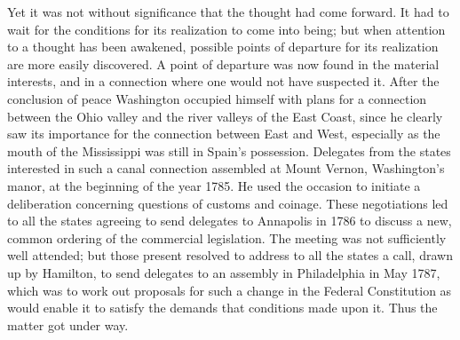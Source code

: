 \documentclass[12pt,a4paper,openany]{book}
\begin{document}
Yet it was not without significance that the thought had come
forward. It had to wait for the conditions for its
realization to come into being; but when attention to a thought
has been awakened, possible points of departure for its
realization are more easily discovered. A point of departure was now found in the material
interests, and in a connection where one would not have
suspected it. After the conclusion of peace Washington occupied
himself with plans for a connection between the Ohio valley and
the river valleys of the East Coast, since he clearly saw its importance for
the connection between East and West, especially as the mouth of the Mississippi
was still in Spain's possession. Delegates from the states
interested in such a canal connection assembled at
Mount Vernon, Washington's manor, at the beginning of the
year 1785. He used the occasion to initiate a
deliberation concerning questions of customs and coinage. These
negotiations led to all the states agreeing to send
delegates to Annapolis in 1786 to discuss a new, common
ordering of the commercial legislation. The meeting was not
sufficiently well attended; but those present resolved to address
to all the states a call, drawn up by Hamilton, to
send delegates to an assembly in Philadelphia in May 1787,
which was to work out proposals for such a change in
the Federal Constitution as would enable it to
satisfy the demands that conditions made upon it. Thus
the matter got under way.
\end{document}
